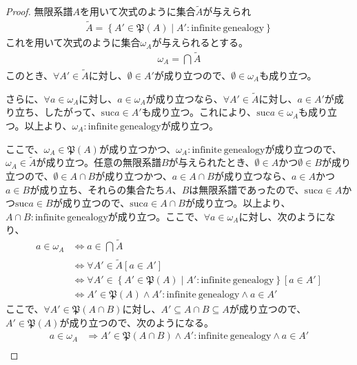 \documentclass[dvipdfmx]{jsarticle}
\begin{document}
\begin{proof}
無限系譜$A$を用いて次式のように集合$\widetilde{A}$が与えられ
\begin{align*}
\widetilde{A} = \left\{ A'\in \mathfrak{P}(A) \middle| A':\mathrm{infinite\ genealogy} \right\}
\end{align*}
これを用いて次式のように集合$\omega_{A}$が与えられるとする。
\begin{align*}
\omega_{A} = \bigcap_{} \widetilde{A}
\end{align*}
このとき、$\forall A' \in \widetilde{A}$に対し、$\emptyset \in A'$が成り立つので、$\emptyset \in \omega_{A}$も成り立つ。\par
さらに、$\forall a \in \omega_{A}$に対し、$a \in \omega_{A}$が成り立つなら、$\forall A' \in \widetilde{A}$に対し、$a \in A'$が成り立ち、したがって、${\mathrm{suc} }a \in A'$も成り立つ。これにより、${\mathrm{suc} }a \in \omega_{A}$も成り立つ。以上より、$\omega_{A}:\mathrm{infinite\ genealogy}$が成り立つ。\par
ここで、$\omega_{A}\in \mathfrak{P}(A)$が成り立つかつ、$\omega_{A}:\mathrm{infinite\ genealogy}$が成り立つので、$\omega_{A} \in \widetilde{A}$が成り立つ。任意の無限系譜$B$が与えられたとき、$\emptyset \in A$かつ$\emptyset \in B$が成り立つので、$\emptyset \in A \cap B$が成り立つかつ、$a \in A \cap B$が成り立つなら、$a \in A$かつ$a \in B$が成り立ち、それらの集合たち$A$、$B$は無限系譜であったので、${\mathrm{suc} }a \in A$かつ${\mathrm{suc} }a \in B$が成り立つので、${\mathrm{suc} }a \in A \cap B$が成り立つ。以上より、$A \cap B:\mathrm{infinite\ genealogy}$が成り立つ。ここで、$\forall a \in \omega_{A}$に対し、次のようになり、
\begin{align*}
a \in \omega_{A} &\Leftrightarrow a \in \bigcap_{} \widetilde{A}\\
&\Leftrightarrow \forall A' \in \widetilde{A}\left[ a \in A' \right]\\
&\Leftrightarrow \forall A' \in \left\{ A'\in \mathfrak{P}(A) \middle| A':\mathrm{infinite\ genealogy} \right\}\left[ a \in A' \right]\\
&\Leftrightarrow A'\in \mathfrak{P}(A) \land A':\mathrm{infinite\ genealogy} \land a \in A'
\end{align*}
ここで、$\forall A'\in \mathfrak{P}(A \cap B)$に対し、$A' \subseteq A \cap B \subseteq A$が成り立つので、$A'\in \mathfrak{P}(A)$が成り立つので、次のようになる。
\begin{align*}
a \in \omega_{A} &\Rightarrow A'\in \mathfrak{P}(A \cap B) \land A':\mathrm{infinite\ genealogy} \land a \in A'\\

\end{align*}
\end{proof}
\end{document}
